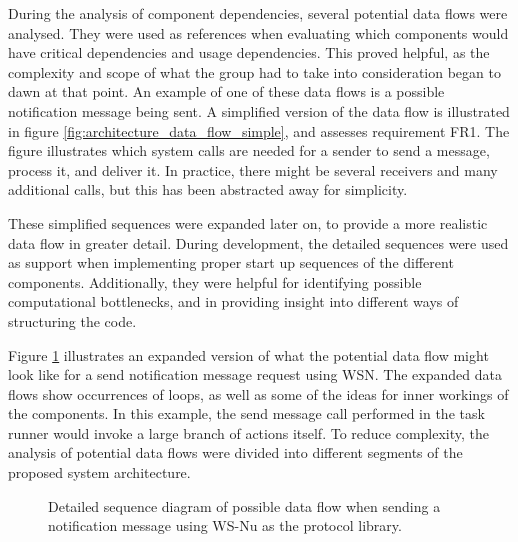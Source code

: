 During the analysis of component dependencies, several potential data flows were analysed. They were used as references when evaluating which components would have critical dependencies and usage dependencies. This proved helpful, as the complexity and scope of what the group had to take into consideration began to dawn at that point. An example of one of these data flows is a possible notification message being sent. A simplified version of the data flow is illustrated in figure \ref{fig:architecture_data_flow_simple}, and assesses requirement FR1.
The figure illustrates which system calls are needed for a sender to send a message, process it, and deliver it. In practice, there might be several receivers and many additional calls, but this has been abstracted away for simplicity.

These simplified sequences were expanded later on, to provide a more realistic data flow in greater detail. During development, the detailed sequences were used as support when implementing proper start up sequences of the different components. Additionally, they were helpful for identifying possible computational bottlenecks, and in providing insight into different ways of structuring the code.

Figure \ref{fig:architecture_data_flow} illustrates an expanded version of what the potential data flow might look like for a send notification message request using WSN. The expanded data flows show occurrences of loops, as well as some of the ideas for inner workings of the components. In this example, the send message call performed in the task runner would invoke a large branch of actions itself. To reduce complexity, the analysis of potential data flows were divided into different segments of the proposed system architecture.

\begin{center}
  \begin{figure}[t]
    \caption{Detailed sequence diagram of possible data flow when sending a notification message using WS-Nu as the protocol library.}
    \label{fig:architecture_data_flow}
  \end{figure}
\end{center}

